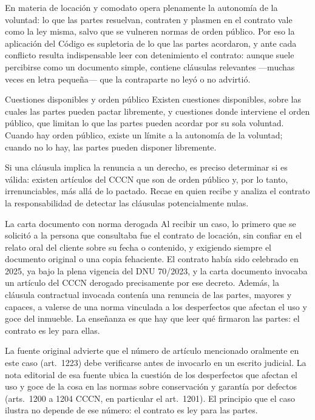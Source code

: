 \documentclass[12pt,oneside]{book}
\begin{document}
En materia de locación y comodato opera plenamente la autonomía de la voluntad: lo que las partes resuelvan, contraten y plasmen en el contrato vale como la ley misma, salvo que se vulneren normas de orden público. Por eso la aplicación del Código es supletoria de lo que las partes acordaron, y ante cada conflicto resulta indispensable leer con detenimiento el contrato: aunque suele percibirse como un documento simple, contiene cláusulas relevantes ---muchas veces en letra pequeña--- que la contraparte no leyó o no advirtió.

\begin{definition}{Cuestiones disponibles y orden público}
Existen cuestiones disponibles, sobre las cuales las partes pueden pactar libremente, y cuestiones donde interviene el orden público, que limitan lo que las partes pueden acordar por su sola voluntad. Cuando hay orden público, existe un límite a la autonomía de la voluntad; cuando no lo hay, las partes pueden disponer libremente.
\end{definition}

Si una cláusula implica la renuncia a un derecho, es preciso determinar si es válida: existen artículos del CCCN que son de orden público y, por lo tanto, irrenunciables, más allá de lo pactado. Recae en quien recibe y analiza el contrato la responsabilidad de detectar las cláusulas potencialmente nulas.

\begin{example}{La carta documento con norma derogada}
Al recibir un caso, lo primero que se solicitó a la persona que consultaba fue el contrato de locación, sin confiar en el relato oral del cliente sobre su fecha o contenido, y exigiendo siempre el documento original o una copia fehaciente. El contrato había sido celebrado en 2025, ya bajo la plena vigencia del DNU 70/2023, y la carta documento invocaba un artículo del CCCN derogado precisamente por ese decreto. Además, la cláusula contractual invocada contenía una renuncia de las partes, mayores y capaces, a valerse de una norma vinculada a los desperfectos que afectan el uso y goce del inmueble. La enseñanza es que hay que leer qué firmaron las partes: el contrato es ley para ellas.
\end{example}

\begin{note}
La fuente original advierte que el número de artículo mencionado oralmente en este caso (art.\ 1223) debe verificarse antes de invocarlo en un escrito judicial. La nota editorial de esa fuente ubica la cuestión de los desperfectos que afectan el uso y goce de la cosa en las normas sobre conservación y garantía por defectos (arts.\ 1200 a 1204 CCCN, en particular el art.\ 1201). El principio que el caso ilustra no depende de ese número: el contrato es ley para las partes.
\end{note}
\end{document}
